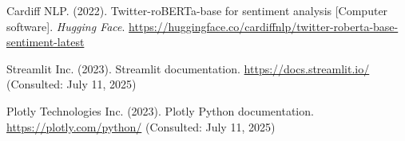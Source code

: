 \documentclass[12pt,a4paper,twoside,openany]{book}
\begin{document}
\begin{thebibliography}{99}
Cardiff NLP. (2022). Twitter-roBERTa-base for sentiment analysis [Computer software]. \textit{Hugging Face}. \url{https://huggingface.co/cardiffnlp/twitter-roberta-base-sentiment-latest}

Streamlit Inc. (2023). Streamlit documentation. \url{https://docs.streamlit.io/} (Consulted: July 11, 2025)

Plotly Technologies Inc. (2023). Plotly Python documentation. \url{https://plotly.com/python/} (Consulted: July 11, 2025)

\end{thebibliography}
\end{document}

